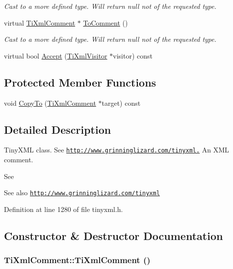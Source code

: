 \begin{DoxyCompactItemize}
\begin{DoxyCompactList}\small\item\em Cast to a more defined type. Will return null not of the requested type. \item\end{DoxyCompactList}\item 
virtual \hyperlink{class_ti_xml_comment}{TiXmlComment} $\ast$ \hyperlink{class_ti_xml_comment_acc7c7e07e13c23f17797d642981511df}{ToComment} ()
\begin{DoxyCompactList}\small\item\em Cast to a more defined type. Will return null not of the requested type. \item\end{DoxyCompactList}\item 
virtual bool \hyperlink{class_ti_xml_comment_a4382de0e50da973f11a23ea5852568bd}{Accept} (\hyperlink{class_ti_xml_visitor}{TiXmlVisitor} $\ast$visitor) const 
\end{DoxyCompactItemize}
\subsection*{Protected Member Functions}
\begin{DoxyCompactItemize}
\item 
void \hyperlink{class_ti_xml_comment_a3175b2f27628f4fb7a043897930cd934}{CopyTo} (\hyperlink{class_ti_xml_comment}{TiXmlComment} $\ast$target) const 
\end{DoxyCompactItemize}


\subsection{Detailed Description}
TinyXML class. See \href{http://www.grinninglizard.com/tinyxml.}{\tt http://www.grinninglizard.com/tinyxml.} An XML comment.

See \begin{DoxySeeAlso}{See also}
\href{http://www.grinninglizard.com/tinyxml}{\tt http://www.grinninglizard.com/tinyxml} 
\end{DoxySeeAlso}


Definition at line 1280 of file tinyxml.h.

\subsection{Constructor \& Destructor Documentation}
\hypertarget{class_ti_xml_comment_aaa3252031d3e8bd3a2bf51a1c61201b7}{
\subsubsection[{TiXmlComment}]{\setlength{\rightskip}{0pt plus 5cm}TiXmlComment::TiXmlComment ()}}
\label{class_ti_xml_comment_aaa3252031d3e8bd3a2bf51a1c61201b7}


